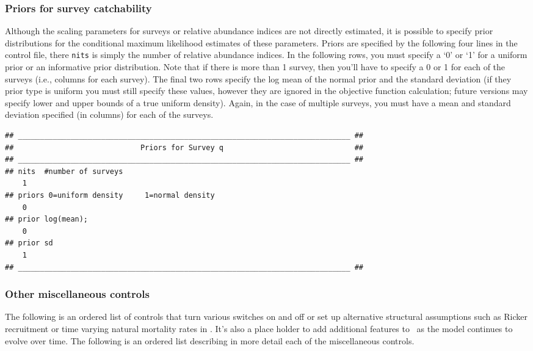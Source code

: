 \begin{multicols}{2}
\subsubsection{Priors for survey catchability}
Although the scaling parameters for surveys or relative abundance indices are not directly estimated, it is possible to specify prior distributions for the conditional maximum likelihood estimates of these parameters. Priors are specified by the following four lines in the control file, there \verb"nits" is simply the number of relative abundance indices.  In the following rows, you must specify a `0' or `1' for a uniform prior or an informative prior distribution.  Note that if there is more than 1 survey, then you'll have to specify a 0 or 1 for each of the surveys (i.e., columns for each survey).  The final two rows specify the log mean of the normal prior and the standard deviation (if they prior type is uniform you must still specify these values, however they are ignored in the objective function calculation; future versions may specify lower and upper bounds of a true uniform density).  Again, in the case of multiple surveys, you must have a mean and standard deviation specified (in columns) for each of the surveys.

\begin{tiny}
\begin{verbatim}
## ____________________________________________________________________________ ##
##                             Priors for Survey q                              ##
## ____________________________________________________________________________ ##
## nits  #number of surveys
    1
## priors 0=uniform density     1=normal density
    0
## prior log(mean);
    0
## prior sd
    1
## ____________________________________________________________________________ ##
\end{verbatim}
\end{tiny}


\subsubsection{Other miscellaneous controls}
The following is an ordered list of controls that turn various switches on and off or set up alternative structural assumptions such as Ricker recruitment or time varying natural mortality rates in \iscam.  It's also a place holder to add additional features to \iscam\ as the model continues to evolve over time. The following is an ordered list describing in more detail each of the miscellaneous controls.


\end{multicols}
